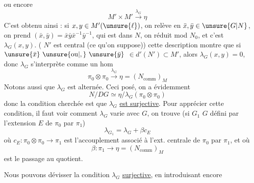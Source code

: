 ou encore
\[
M'\times M'\xrightarrow{\lambda_G}\eta
\]
C'est obtenu ainsi : si $x,y\in M'(\unsure{\ell})$, on relève en
$\bar{x},\bar{y}\in\unsure{G|N}$, on prend $(\bar{x},\bar{y})=\bar{x}\bar{y}\bar{x}^{-1}\bar{y}^{-1}$, qui est
dans $N$, on réduit mod $N_0$, et c'est $\lambda_G(x,y)$.
( $N'$ est central (ce qu'on suppose))
cette description montre que si $\unsure{\bar{x}}\ \unsure{\text{ou}|,}\ \unsure{\bar{y}}$
$\in d'(N')\subset M'$, alors  $\lambda_G(x,y)=0$, donc $\lambda_G$
s'interprète comme un hom
\[
\pi_0\otimes\pi_0\xrightarrow{\lambda_G}\eta=(N_{\mathrm{comm}})_M
\]
Notons aussi que $\lambda_G$ est alternée. Ceci
posé,  on a évidemment
\[
N/DG\simeq\eta/\lambda_G(\pi_0\otimes\pi_0)
\]
donc la condition cherchée est que
$\lambda_G$ \uline{est surjective}. Pour apprécier
cette condition, il faut voir comment
$\lambda_G$ varie avec $G$, on trouve (si $G_1$ 
$G$ défini par l'extension $E$ de $\pi_0$ par $\pi_1$)
\[
\lambda_{G_1}=\lambda_G+\beta c_E
\]
où $c_E:\pi_0\otimes\pi_0\longrightarrow\pi_1$ est l'accouplement
associé à l'ext. centrale de $\pi_0$  par $\pi_1$,
et où
\[
\beta:\pi_1\longrightarrow\eta=(N_{\mathrm{comm}})_M
\]
est le passage au quotient. 

Nous pouvons dévisser la condition
$\lambda_G$ \uline{surjective}, en introduisant encore
